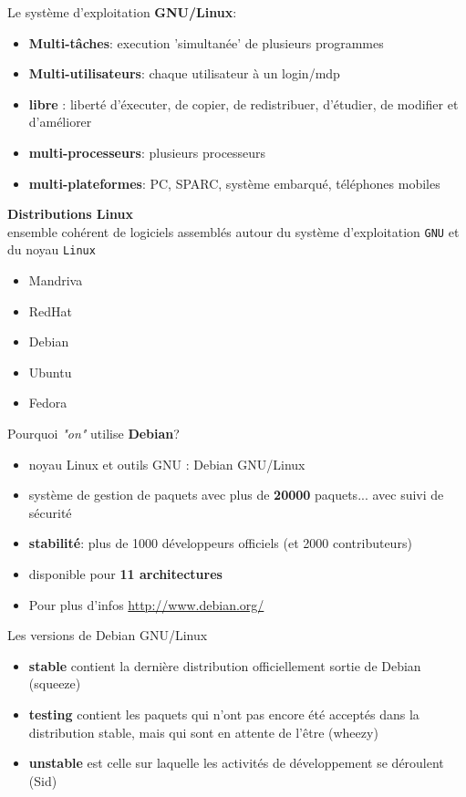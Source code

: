 \documentclass[french]{beamer}
\begin{document}
\begin{frame}
Le système d'exploitation \textbf{GNU/Linux}:
    \begin{itemize}
    \item \textbf{Multi-tâches}: execution 'simultanée' de plusieurs programmes
    \item \textbf{Multi-utilisateurs}: chaque utilisateur à un login/mdp
    \item \textbf{libre} : liberté d'éxecuter, de copier, de redistribuer, d'étudier, de
    modifier et d'améliorer
    \item \textbf{multi-processeurs}: plusieurs processeurs
    \item \textbf{multi-plateformes}: PC, SPARC, système embarqué, téléphones
    mobiles
    \end{itemize}
\end{frame}

\begin{frame}
\textbf{Distributions Linux} \\
ensemble cohérent de logiciels assemblés autour du système d'exploitation
\texttt{GNU} et du noyau \texttt{Linux}
    \begin{itemize}
    \item Mandriva 
    \item RedHat
    \item Debian
    \item Ubuntu
    \item Fedora
    \end{itemize}
\end{frame}

\begin{frame}
Pourquoi \textit{"on"} utilise \textbf{Debian}?

\begin{itemize}
\item noyau Linux et outils GNU : Debian GNU/Linux
\item système de gestion de paquets avec plus de \textbf{20000} paquets... avec suivi de sécurité
\item \textbf{stabilité}: plus de 1000 développeurs officiels (et 2000 contributeurs)
\item disponible pour \textbf{11 architectures} 
\item Pour plus d'infos \url{http://www.debian.org/}
\end{itemize}
\end{frame}

\begin{frame}
Les versions de Debian GNU/Linux
\begin{itemize}
\item \textbf{stable} contient la dernière distribution officiellement sortie de Debian (squeeze)
\item \textbf{testing} contient les paquets qui n'ont pas encore été acceptés dans la distribution stable, mais qui sont en attente de l'être (wheezy)
\item \textbf{unstable}  est celle sur laquelle les activités de développement se déroulent (Sid)
\end{itemize}
\end{frame}
\end{document}
